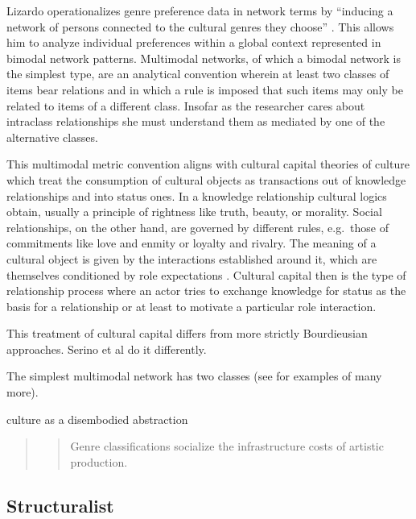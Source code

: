 \documentclass[]{book}
\theoremstyle{definition}
\theoremstyle{definition}
\theoremstyle{definition}
\theoremstyle{remark}
\begin{document}
Lizardo operationalizes genre preference data in network terms by
``inducing a network of persons connected to the cultural genres they
choose'' \citeyearpar[53]{Lizardo2018mutual}. This allows him to analyze
individual preferences within a global context represented in bimodal
network patterns. Multimodal networks, of which a bimodal network is the
simplest type, are an analytical convention wherein at least two classes
of items bear relations and in which a rule is imposed that such items
may only be related to items of a different class. Insofar as the
researcher cares about intraclass relationships she must understand them
as mediated by one of the alternative classes.

This multimodal metric convention aligns with cultural capital theories
of culture which treat the consumption of cultural objects as
transactions out of knowledge relationships and into status ones. In a
knowledge relationship cultural logics obtain, usually a principle of
rightness like truth, beauty, or morality. Social relationships, on the
other hand, are governed by different rules, e.g.~those of commitments
like love and enmity or loyalty and rivalry. The meaning of a cultural
object is given by the interactions established around it, which are
themselves conditioned by role expectations
\citep[445]{DiMaggio1987Classification}. Cultural capital then is the
type of relationship process where an actor tries to exchange knowledge
for status as the basis for a relationship or at least to motivate a
particular role interaction.

This treatment of cultural capital differs from more strictly
Bourdieusian approaches. Serino et al \citeyearpar{Serino2017Bridging}
do it differently.

The simplest multimodal network has two classes (see
\citep{Shi2015Weaving} for examples of many more).

culture as a disembodied abstraction \citep{Lizardo2018mutual}

\begin{quote}
\begin{quote}
Genre classifications socialize the infrastructure costs of artistic
production. \citep[445]{DiMaggio1987Classification}
\end{quote}
\end{quote}

\hypertarget{structuralist}{%
\subsection{Structuralist}\label{structuralist}}
\end{document}
